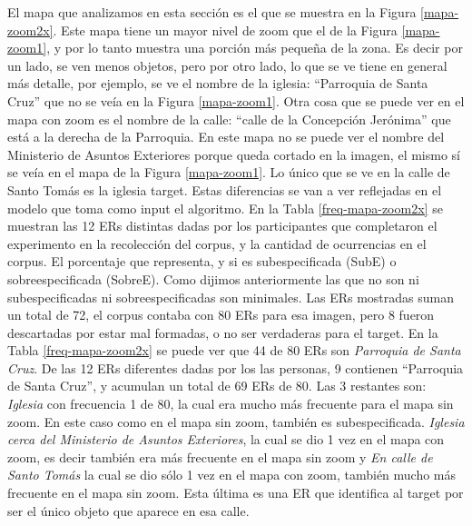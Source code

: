 El mapa que analizamos en esta secci\'on es el que se muestra en la Figura \ref{mapa-zoom2x}. Este mapa tiene un mayor nivel de zoom que el de la Figura \ref{mapa-zoom1}, y por lo tanto muestra una porci\'on m\'as peque\~na de la zona. Es decir por un lado, se ven menos objetos, pero por otro lado, lo que se ve tiene en general m\'as detalle, por ejemplo, se ve el nombre de la iglesia:
 ``Parroquia de Santa Cruz'' que no se ve\'ia en la Figura \ref{mapa-zoom1}. Otra cosa 
que se puede ver en el mapa con zoom es el nombre de la calle: ``calle de la Concepci\'on Jer\'onima'' que est\'a a la derecha de la Parroquia.
En este mapa no se puede ver el nombre del Ministerio de Asuntos Exteriores porque queda cortado en la imagen, el mismo s\'i se ve\'ia en el mapa de la Figura \ref{mapa-zoom1}. Lo \'unico que se ve en la calle de Santo Tom\'as es la iglesia target. Estas diferencias se van a ver reflejadas en el modelo que toma como input el algoritmo.
En la Tabla \ref{freq-mapa-zoom2x} se muestran las 12 ERs distintas dadas por los participantes que completaron el experimento en la recolecci\'on del corpus, y la cantidad de ocurrencias en el corpus. El porcentaje que representa, y si es subespecificada (SubE) o sobreespecificada (SobreE). Como dijimos anteriormente las que no son ni subespecificadas ni sobreespecificadas son minimales. Las ERs mostradas suman un total de 72, el corpus contaba con 80 ERs para esa imagen, pero 8 fueron descartadas por estar mal formadas, o no ser verdaderas para el target.
En la Tabla \ref{freq-mapa-zoom2x} se puede ver que 44 de 80 ERs son {\it Parroquia de Santa Cruz}. De las 12 ERs diferentes dadas por los las personas, 9 contienen ``Parroquia de Santa Cruz'', y acumulan un total de 69 ERs de 80. Las 3 restantes son: {\it Iglesia} con frecuencia 1 de 80, la cual era mucho m\'as frecuente para el mapa sin zoom. En este caso como en el mapa sin zoom, tambi\'en es subespecificada. {\it Iglesia cerca del Ministerio de Asuntos Exteriores}, la cual se dio 1 vez en el mapa con zoom, es decir tambi\'en era m\'as frecuente en el mapa sin zoom y {\it En calle de Santo Tom\'as} la cual se dio s\'olo 1 vez en el mapa con zoom, tambi\'en mucho m\'as frecuente en el mapa sin zoom. Esta \'ultima es una ER que identifica al target por ser el \'unico objeto que aparece en esa calle.

\medskip

